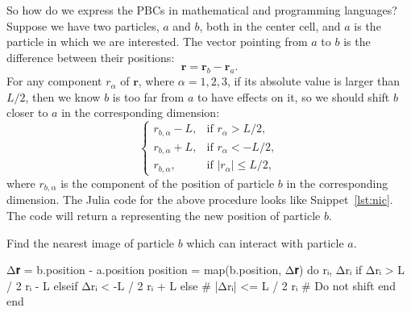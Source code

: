 So how do we express the PBCs in mathematical and programming languages?
Suppose we have two particles, $a$ and $b$, both in the center cell,
and $a$ is the particle in which we
are interested. The vector pointing from $a$ to $b$ is the difference between
their positions:
%
\begin{equation}
    \bm{r} = \bm{r}_b - \bm{r}_a.
\end{equation}
%
For any component $r_\alpha$ of $\bm{r}$, where $\alpha = 1, 2, 3$, if its absolute value
is larger than $L / 2$, then we know $b$ is too far from $a$ to have effects on it,
so we should shift $b$ closer to $a$ in the corresponding dimension:
%
\begin{equation}
    \begin{cases}
        r_{b, \alpha} - L, & \text{if } r_\alpha > L / 2,                  \\
        r_{b, \alpha} + L, & \text{if } r_\alpha < -L / 2,                 \\
        r_{b, \alpha},     & \text{if } \lvert r_\alpha \rvert \leq L / 2,
    \end{cases}
\end{equation}
%
where $r_{b, \alpha}$ is the component of the position of particle $b$ in the
corresponding dimension.
The Julia code for the above procedure looks like Snippet~\ref{lst:nic}.
The code will return a  representing the new position of particle $b$.

\begin{algorithm}
    \caption{Find the nearest image of particle $b$ which can interact with particle $a$.}
    \label{lst:nic}
    \begin{juliacode}
        Δ𝐫 = b.position - a.position
        position = map(b.position, Δ𝐫) do rᵢ, Δrᵢ
            if Δrᵢ > L / 2
                rᵢ - L
            elseif Δrᵢ < -L / 2
                rᵢ + L
            else  # |Δrᵢ| <= L / 2
                rᵢ  # Do not shift
            end
        end
    \end{juliacode}
\end{algorithm}

